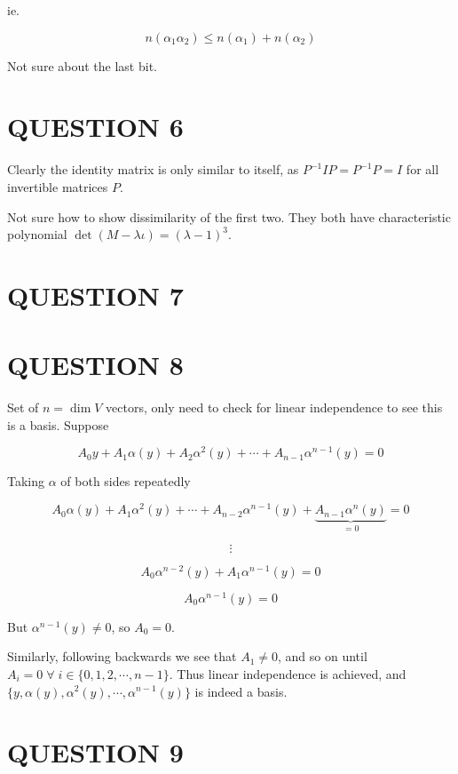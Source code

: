\documentclass[a4paper]{article}
\begin{document}
ie.

\[n(\alpha_{1}\alpha_{2}) \leq   n(\alpha_{1}) + n(\alpha_{2})  \]

Not sure about the last bit. 

\section{QUESTION 6}

Clearly the identity matrix is only similar to itself, as $ P^{-1} I P = P^{-1} P = I $ for all invertible matrices $ P $. 

Not sure how to show dissimilarity of the first two. They both have characteristic polynomial $ \det(M - \lambda \iota) = (\lambda - 1)^{3} $. 

\section{QUESTION 7}
\section{QUESTION 8}

Set of $ n = \dim V $ vectors, only need to check for linear independence to see this is a basis. Suppose

\[ A_{0} y + A_{1} \alpha(y) + A_{2} \alpha^{2}(y) + \cdots + A_{n-1} \alpha^{n-1}(y) = 0 \]

Taking $ \alpha $ of both sides repeatedly

\[  A_{0} \alpha(y) + A_{1} \alpha^{2}(y) + \cdots + A_{n-2}  \alpha^{n-1}(y) +  \underbrace{A_{n-1} \alpha^{n}(y)}_{=0} = 0 \]

\[ \vdots \]

\[ A_{0} \alpha^{n-2}(y) + A_{1} \alpha^{n-1}(y) = 0 \]

\[ A_{0} \alpha^{n-1}(y) = 0 \]

But $ \alpha^{n-1}(y) \neq 0 $, so $ A_{0} = 0 $.

Similarly, following backwards we see that $ A_{1} \neq 0 $, and so on until $ A_{i} = 0 \; \forall \; i \in \{ 0,1,2,\cdots,n-1 \} $. Thus linear independence is achieved, and $ \{  y,\alpha(y),\alpha^{2}(y),\cdots,\alpha^{n-1}(y) \} $ is indeed a basis. 




\section{QUESTION 9}
\end{document}
